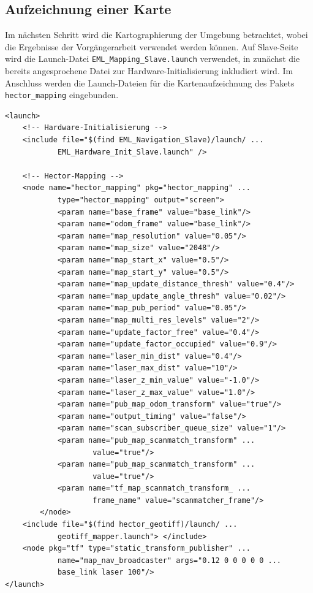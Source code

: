 \subsection{Aufzeichnung einer Karte}
Im nächsten Schritt wird die Kartographierung der Umgebung betrachtet, wobei die Ergebnisse der Vorgängerarbeit \cite[S. 47, ff]{Turtleboys} verwendet werden können. Auf Slave-Seite wird die Launch-Datei \lstinline{EML_Mapping_Slave.launch}{} verwendet, in zunächst die bereits angesprochene Datei zur Hardware-Initialisierung inkludiert wird. Im Anschluss werden die Launch-Dateien für die Kartenaufzeichnung des Pakets \lstinline{hector_mapping}{} \cite{WikiHector} eingebunden.
\begin{lstlisting}[caption={EML\_Mapping\_Slave.launch},captionpos=b]
<launch>
	<!-- Hardware-Initialisierung -->
	<include file="$(find EML_Navigation_Slave)/launch/ ... 
			EML_Hardware_Init_Slave.launch" />

	<!-- Hector-Mapping -->
	<node name="hector_mapping" pkg="hector_mapping" ...
			type="hector_mapping" output="screen">
        	<param name="base_frame" value="base_link"/>
        	<param name="odom_frame" value="base_link"/>
	        <param name="map_resolution" value="0.05"/>
	        <param name="map_size" value="2048"/>
	        <param name="map_start_x" value="0.5"/>
        	<param name="map_start_y" value="0.5"/>
	        <param name="map_update_distance_thresh" value="0.4"/>
	        <param name="map_update_angle_thresh" value="0.02"/>
	        <param name="map_pub_period" value="0.05"/>
	        <param name="map_multi_res_levels" value="2"/>
	        <param name="update_factor_free" value="0.4"/>
	        <param name="update_factor_occupied" value="0.9"/>
	        <param name="laser_min_dist" value="0.4"/>
	        <param name="laser_max_dist" value="10"/>
	        <param name="laser_z_min_value" value="-1.0"/>
	        <param name="laser_z_max_value" value="1.0"/>
	        <param name="pub_map_odom_transform" value="true"/>
	        <param name="output_timing" value="false"/>
	        <param name="scan_subscriber_queue_size" value="1"/>
	        <param name="pub_map_scanmatch_transform" ...
	        		value="true"/>
	        <param name="pub_map_scanmatch_transform" ...
	        		value="true"/>
	        <param name="tf_map_scanmatch_transform_ ...
	        		frame_name" value="scanmatcher_frame"/>
	    </node>
    <include file="$(find hector_geotiff)/launch/ ...
    		geotiff_mapper.launch"> </include>
    <node pkg="tf" type="static_transform_publisher" ...
    		name="map_nav_broadcaster" args="0.12 0 0 0 0 0 ...
    		base_link laser 100"/>
</launch>
\end{lstlisting}
